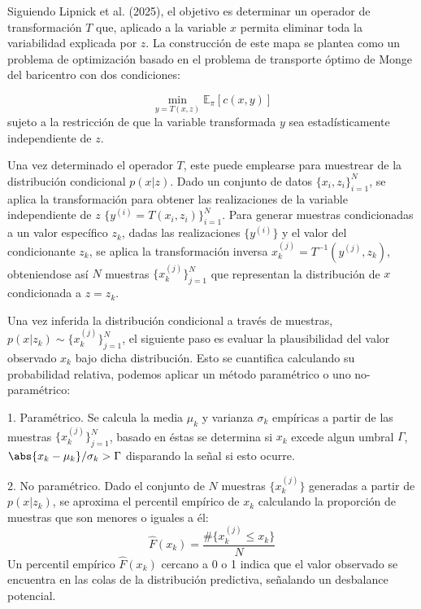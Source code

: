 \documentclass{myarticle}
\begin{document}
Siguiendo Lipnick et al. (2025), el objetivo es determinar un operador de transformación \( T \) que, aplicado a la variable \( x \) permita eliminar toda la variabilidad explicada por \( z \). La construcción de este mapa se plantea como un problema de optimización basado en el problema de transporte óptimo de Monge del baricentro  con dos condiciones:

\[
\min_{y = T(x,z)} \mathbb{E}_{\pi} \left[ c(x, y) \right]
\]
sujeto a la restricción de que la variable transformada \( y \) sea estadísticamente independiente de \( z \).


Una vez determinado el operador \( T \), este puede emplearse para muestrear de la distribución condicional \( p(x | z) \). Dado un conjunto de datos \( \{x_i, z_i\}_{i=1}^N \), se aplica la transformación para obtener las realizaciones de la variable independiente de $z$ \( \{ y^{(i)} = T(x_i, z_i)\}_{i=1}^N \). Para generar muestras condicionadas a un valor específico \( z_k \), dadas las realizaciones \( \{y^{(i)}\} \) y el valor del condicionante \( z_k \), se aplica la transformación inversa \( x_k^{(j)} = T^{-1}(y^{(j)}, z_k) \), obteniendose así \( N \) muestras \( \{x_k^{(j)}\}_{j=1}^N \) que representan la distribución de \( x \) condicionada a \( z = z_k \).

Una vez inferida la distribución condicional a trav\'es de muestras, $p(x|z_k)\sim \{x_k^{(j)}\}_{j=1}^N$,  el siguiente paso es evaluar la plausibilidad del valor observado $x_k$ bajo dicha distribución. Esto se cuantifica calculando su probabilidad relativa, podemos aplicar un método paramétrico o uno no-paramétrico:

1.  Param\'etrico. Se calcula la media $\mu_k$ y varianza $\sigma_k$ emp\'iricas a partir de las muestras $\{x_k^{(j)}\}_{j=1}^N$, basado en \'estas se determina si $x_k$ excede algun umbral $\Gamma$, $\abs{x_k-\mu_k}/\sigma_k > \Gamma$ disparando la se\~nal si esto ocurre.

2. No param\'etrico. Dado el conjunto de \( N \) muestras \( \{x_k^{(j)}\} \) generadas a partir de \( p(x | z_k) \), se  aproxima el percentil empírico de \( x_k \) calculando la proporción de muestras que son menores o iguales a él:
    \[
    \hat{F}(x_k) = \frac{ \#\{ x_k^{(j)} \leq x_k \} }{N}
    \]
    Un percentil empírico \( \hat{F}(x_k) \) cercano a 0 o 1 indica que el valor observado se encuentra en las colas de la distribución predictiva, señalando un desbalance potencial.
\end{document}
